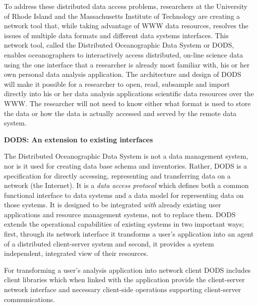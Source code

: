 To address these distributed data access problems, researchers at the
University of Rhode Island and the Massachusetts Institute of Technology are
creating a network tool that, while taking advantage of WWW data resources,
resolves the issues of multiple data formats and different data systems
interfaces.  This network tool, called the Distributed Oceanographic Data
System or DODS, enables oceanographers to interactively access distributed,
on-line science data using the one interface that a researcher is already
most familiar with, his or her own personal data analysis application.  The
architecture and design of DODS will make it possible for a researcher to
open, read, subsample and import directly into his or her data analysis
applications scientific data resources over the WWW.  The researcher will not
need to know either what format is used to store the data or how the data is
actually accessed and served by the remote data system.

\large
\bigskip
\noindent
{\bf DODS: An extension to existing interfaces}
\medskip
\normalsize 

\noindent The Distributed Oceanographic Data System is not a data management
system, nor is it used for creating data base schema and inventories.
Rather, DODS is a specification for directly accessing, representing and
transferring data on a network (the Internet).  It is a {\em data access
  protocol} which defines both a common functional interface to data systems
and a data model for representing data on those systems.  It is designed to
be integrated {\em with\/} already existing user applications and resource
management systems, not to replace them.  DODS extends the operational
capabilities of existing systems in two important ways; first, through its
network interface it transforms a user's application into an agent of a
distributed client-server system and second, it provides a system
independent, integrated view of their resources.

For transforming a user's analysis application into network client DODS
includes client libraries which when linked with the application provide the
client-server network interface and necessary client-side operations
supporting client-server communications.  

